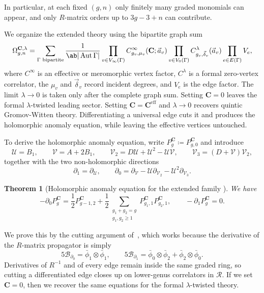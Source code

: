 \documentclass{amsart}
\newtheorem{thm}{Theorem}[section]
\theoremstyle{definition}
\theoremstyle{remark}
\theoremstyle{plain}
\theoremstyle{definition}
\theoremstyle{remark}
\newcommand{\g}{\mathfrak{g}}
\newcommand{\mc}[1]{\mathcal{#1}}
\newcommand{\mbf}[1]{\mathbf{#1}}
\newcommand{\mr}[1]{\mathrm{#1}}
\newcommand{\1}{\mathbf{1}}
\newcommand{\2}{\mathbf{2}}
\newcommand{\3}{\mathbf{3}}
\DeclareMathOperator{\Aut}{Aut}
\begin{document}
In particular, at each fixed \((g,n)\) only finitely many graded monomials can appear, and only \(R\)-matrix orders up to \(3g-3+n\) can contribute.

We organize the extended theory using the bipartite graph sum
\[ \Omega^{\mbf{C},\lambda}_{g,n} = \sum_{\Gamma \text{ bipartite}} \frac{1}{\ab|\Aut\Gamma|}\prod_{v\in V_{\infty}(\Gamma)} C^{\infty}_{g_v,\mu_v}(\mbf{C};\vec{a}_v) \prod_{v \in V_0(\Gamma)}C^{\lambda}_{g_v,\vec{\delta}_v}(\vec{a}_v)\prod_{e \in E(\Gamma)}V_e, \]
where \(C^{\infty}\) is an effective or meromorphic vertex factor, \(C^{\lambda}\) is a formal zero-vertex correlator, the \(\mu_v\) and \(\vec{\delta}_v\) record incident degrees, and \(V_e\) is the edge factor. The limit \(\lambda \to 0\) is taken only after the complete graph sum. Setting \(\mbf{C}=0\) leaves the formal \(\lambda\)-twisted leading sector. Setting \(\mbf{C}=\mbf{C}^{\mr{eff}}\) and \(\lambda\to0\) recovers quintic Gromov-Witten theory. Differentiating a universal edge cuts it and produces the holomorphic anomaly equation, while leaving the effective vertices untouched.

To derive the holomorphic anomaly equation, write \(P^{\mbf{C}}_g \coloneqq P^{\mbf{C}}_{g,0}\) and introduce
\[ \mc{U} = B_1, \qquad \mc{V} = A + 2B_1, \qquad \mc{V}_2 = D\mc{U} + \mc{U}^2 - \mc{U}\mc{V}, \qquad \mc{V}_3 = (D+\mc{V})\mc{V}_2, \]
together with the two non-holomorphic directions
\[ \partial_1 = \partial_{\mc{U}}, \qquad \partial_0 = \partial_{\mc{V}} - \mc{U}\partial_{\mc{V}_2} - \mc{U}^2\partial_{\mc{V}_3}. \]

\begin{thm}[Holomorphic anomaly equation for the extended family {\cite{GJRstructure}}]
    We have
    \[ -\partial_0 P^{\mbf{C}}_g = \frac{1}{2}P^{\mbf{C}}_{g-1,2} + \frac{1}{2}\sum_{\substack{g_1+g_2=g\\g_1,g_2\geq1}}P^{\mbf{C}}_{g_1,1}P^{\mbf{C}}_{g_2,1}, \qquad -\partial_1 P^{\mbf{C}}_g = 0. \]
\end{thm}

We prove this by the cutting argument of~, which works because the derivative of the \(R\)-matrix propagator is simply
\[ 5\mc{B}_{\partial_0} = \bar{\phi}_1 \otimes \bar{\phi}_1, \qquad 5\mc{B}_{\partial_1} = \bar{\phi}_0\otimes\bar{\phi}_2 + \bar{\phi}_2\otimes\bar{\phi}_0. \]
Derivatives of \(R^{-1}\) and of every edge remain inside the same graded ring, so cutting a differentiated edge closes up on lower-genus correlators in \(\mc{R}\). If we set \(\mbf{C}=0\), then we recover the same equations for the formal \(\lambda\)-twisted theory.
\end{document}
